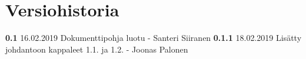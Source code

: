 \chapter*{Versiohistoria}

\newcommand{\currentversion}{0.1.1} %

\textbf{0.1} 16.02.2019 Dokumenttipohja luotu - Santeri Siiranen
\textbf{0.1.1} 18.02.2019 Lisätty johdantoon kappaleet 1.1. ja 1.2. - Joonas Palonen